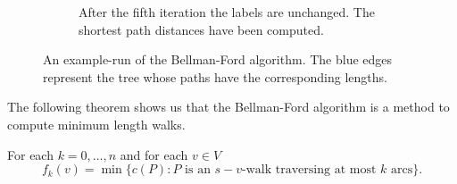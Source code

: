 \begin{figure}
\begin{subfigure}[t]{0.45\textwidth}

     
     \caption{
   After the fifth  iteration the labels are unchanged. The shortest
   path distances have been computed. 
}
   \end{subfigure}
   
 \caption{An example-run of the Bellman-Ford algorithm. The blue
     edges represent the tree whose paths have the corresponding lengths.} \label{f:fig:5}

 \end{figure}




The following theorem shows us that the Bellman-Ford algorithm is a 
method to compute minimum length walks.


\begin{theorem}
  \label{thr:1f2}
  For each $k=0,\ldots,n$ and for each $v \in V$ 
  \begin{displaymath}
    f_k(v)  = \min\{ c(P) \colon  P \text{ is an } s-v\text{-walk traversing
    at most } k \text{ arcs}\}.
  \end{displaymath}
\end{theorem}

